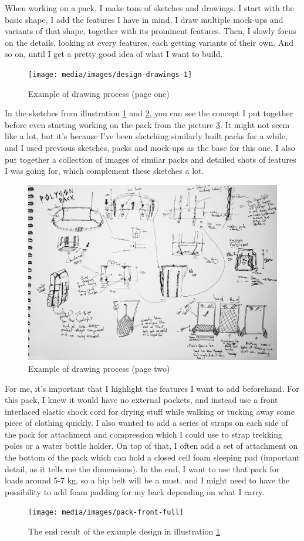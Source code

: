 
When working on a pack, I make tons of sketches and drawings. I start with the basic shape, I add the features I have in mind, I draw multiple mock-ups and variants of that shape, together with its prominent features. Then, I slowly focus on the details, looking at every features, each getting variants of their own. And so on, until I get a pretty good idea of what I want to build.

\begin{figure}[H]
  \texttt{[image: media/images/design-drawings-1]}
  \caption{Example of drawing process (page one)}
  \label{img:design-drawings-1}
\end{figure}

In the sketches from illustration \ref{img:design-drawings-1} and \ref{img:design-drawings-2}, you can see the concept I put together before even starting working on the pack from the picture \ref{img:pack-front-full-intro}. It might not seem like a lot, but it's because I've been sketching similarly built packs for a while, and I used previous sketches, packs and mock-ups as the base for this one. I also put together a collection of images of similar packs and detailed shots of features I was going for, which complement these sketches a lot.

\begin{figure}[H]
  \includegraphics[width=\textwidth]{media/images/design-drawings-2}
  \caption{Example of drawing process (page two)}
  \label{img:design-drawings-2}
\end{figure}

For me, it's important that I highlight the features I want to add beforehand. For this pack, I knew it would have no external pockets, and instead use a front interlaced elastic shock cord for drying stuff while walking or tucking away some piece of clothing quickly. I also wanted to add a series of straps on each side of the pack for attachment and compression which I could use to strap trekking poles or a water bottle holder. On top of that, I often add a set of attachment on the bottom of the pack which can hold a closed cell foam sleeping pad (important detail, as it tells me the dimensions). In the end, I want to use that pack for loads around 5-7 kg, so a hip belt will be a must, and I might need to have the possibility to add foam padding for my back depending on what I carry.

\begin{figure}[H]
  \centering
  \texttt{[image: media/images/pack-front-full]}
  \caption{The end result of the example design in illustration \ref{img:design-drawings-1}}
  \label{img:pack-front-full-intro}
\end{figure}

